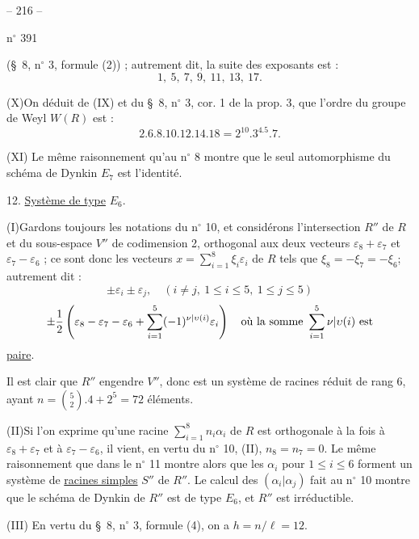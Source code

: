 
\begin{center}-- 216 --\end{center}
\hfill n$^{\circ}$ 391

(\S\ 8, n$^{\circ}$ 3, formule (2)) ; autrement dit, la suite des exposants est :
\[
1,\ 5,\ 7,\ 9,\ 11,\ 13,\ 17.
\]

(X)\quad On déduit de (IX) et du \S\ 8, n$^{\circ}$ 3, cor. 1 de la prop. 3, que l'ordre du
groupe de Weyl $W(R)$ est :
\[
2.6.8.10.12.14.18=2^{10}.3^4.5.7.
\]

(XI) Le même raisonnement qu'au n$^{\circ}$ 8 montre que le seul automorphisme du schéma
de Dynkin $E_7$ est l'identité.

12. \uline{Système de type} $E_6$.

(I)\quad Gardons toujours les notations du n$^{\circ}$ 10, et considérons l'intersection $R''$
de $R$ et du sous-espace $V''$ de codimension 2, orthogonal aux deux vecteurs $\varepsilon_8+\varepsilon_7$
et $\varepsilon_7-\varepsilon_6$ ; ce sont donc les vecteurs $x=\sum_{i=1}^8\xi_i\varepsilon_i$ de $R$ tels que
$\xi_8=-\xi_7=-\xi_6$;
autrement dit :
\[
\pm\varepsilon_i\pm\varepsilon_j,\quad(i\ne j,\ 1\leq i\leq5,\ 1\leq j\leq5)
\]
\[
\pm\frac12\left(\varepsilon_8-\varepsilon_7-\varepsilon_6+
\sum_{i=1}^5(-1)^{{\nu|\upsilon}(i)}\varepsilon_i\right)
\quad\text{où la somme }\sum_{i=1}^5{\nu|\upsilon}(i)\text{ est}
\]
\uline{paire}.

Il est clair que $R''$ engendre $V''$, donc est un système de racines réduit de
rang 6, ayant $n=\binom52.4+2^5=72$ éléments.

(II)\quad Si l'on exprime qu'une racine $\sum_{i=1}^8n_i\alpha_i$ de $R$ est orthogonale à la fois à
$\varepsilon_8+\varepsilon_7$ et à $\varepsilon_7-\varepsilon_6$, il vient, en vertu du n$^{\circ}$ 10, (II), $n_8=n_7=0$. Le même
raisonnement que dans le n$^{\circ}$ 11 montre alors que les $\alpha_i$ pour $1\leq i\leq6$ forment
un système de \uline{racines simples} $S''$ de $R''$. Le calcul des $(\alpha_i|\alpha_j)$ fait au n$^{\circ}$ 10
montre que le schéma de Dynkin de $R''$ est de type $E_6$, et $R''$ est irréductible.

(III) En vertu du \S\ 8, n$^{\circ}$ 3, formule (4), on a $h=n/\ell=12$.

